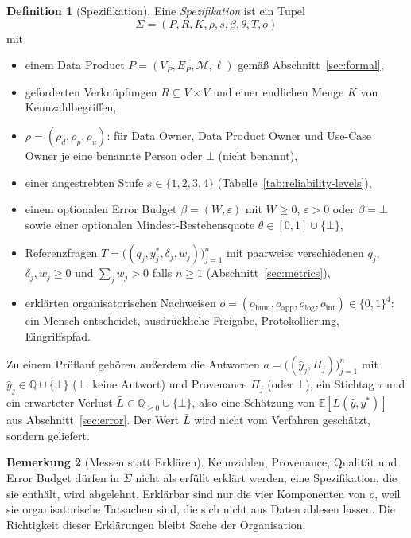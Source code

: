 \documentclass[a4paper,12pt]{article}
\theoremstyle{definition}
\newtheorem{definition}{Definition}[section]
\newtheorem{bemerkung}[definition]{Bemerkung}
\newcommand{\QQ}{\mathbb{Q}}
\newcommand{\E}{\mathbb{E}}
\begin{document}
\begin{definition}[Spezifikation]\label{def:spec}
Eine \emph{Spezifikation} ist ein Tupel
\[
\Sigma=(P,R,K,\rho,s,\beta,\theta,T,o)
\]
mit
\begin{itemize}
\item einem Data Product $P=(V_P,E_P,\mathcal M,\ell)$ gemäß Abschnitt~\ref{sec:formal},
\item geforderten Verknüpfungen $R\subseteq V\times V$ und einer endlichen Menge $K$ von Kennzahlbegriffen,
\item $\rho=(\rho_d,\rho_p,\rho_u)$: für Data Owner, Data Product Owner und Use-Case Owner je eine benannte Person oder $\bot$ (nicht benannt),
\item einer angestrebten Stufe $s\in\{1,2,3,4\}$ (Tabelle~\ref{tab:reliability-levels}),
\item einem optionalen Error Budget $\beta=(W,\varepsilon)$ mit $W\ge 0$, $\varepsilon>0$ oder $\beta=\bot$ sowie einer optionalen Mindest-Bestehensquote $\theta\in[0,1]\cup\{\bot\}$,
\item Referenzfragen $T=\bigl((q_j,y_j^*,\delta_j,w_j)\bigr)_{j=1}^n$ mit paarweise verschiedenen $q_j$, $\delta_j,w_j\ge 0$ und $\sum_j w_j>0$ falls $n\ge 1$ (Abschnitt~\ref{sec:metrics}),
\item erklärten organisatorischen Nachweisen $o=(o_{\mathrm{hum}},o_{\mathrm{app}},o_{\mathrm{log}},o_{\mathrm{int}})\in\{0,1\}^4$: ein Mensch entscheidet, ausdrückliche Freigabe, Protokollierung, Eingriffspfad.
\end{itemize}
\end{definition}

Zu einem Prüflauf gehören außerdem die Antworten $a=\bigl((\hat y_j,\Pi_j)\bigr)_{j=1}^n$ mit $\hat y_j\in\QQ\cup\{\bot\}$ ($\bot$: keine Antwort) und Provenance $\Pi_j$ (oder $\bot$), ein Stichtag $\tau$ und ein erwarteter Verlust $\bar L\in\QQ_{\ge 0}\cup\{\bot\}$, also eine Schätzung von $\E[L(\hat y,y^*)]$ aus Abschnitt~\ref{sec:error}. Der Wert $\bar L$ wird nicht vom Verfahren geschätzt, sondern geliefert.

\begin{bemerkung}[Messen statt Erklären]
Kennzahlen, Provenance, Qualität und Error Budget dürfen in $\Sigma$ nicht als erfüllt erklärt werden; eine Spezifikation, die sie enthält, wird abgelehnt. Erklärbar sind nur die vier Komponenten von $o$, weil sie organisatorische Tatsachen sind, die sich nicht aus Daten ablesen lassen. Die Richtigkeit dieser Erklärungen bleibt Sache der Organisation.
\end{bemerkung}
\end{document}
